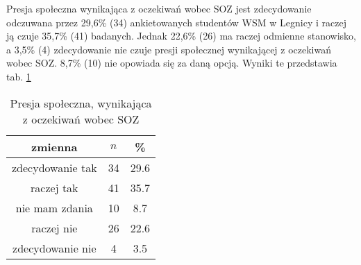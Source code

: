 
Presja społeczna wynikająca z oczekiwań wobec SOZ jest zdecydowanie odczuwana przez 29,6\%  (34) ankietowanych studentów WSM w Legnicy i raczej ją czuje  35,7\% (41) badanych. Jednak 22,6\% (26) ma  raczej odmienne stanowisko, a 3,5\% (4) zdecydowanie nie czuje presji społecznej wynikającej z oczekiwań wobec SOZ. 8,7\% (10) nie opowiada się za daną opcją. Wyniki te przedstawia tab. \ref{tab:Q15}

\begin{table}[H]
\caption{Presja społeczna, wynikająca z oczekiwań wobec SOZ}
\centering
\begin{tabular}{ | c | c | c |}
\hline
zmienna & $n$ & \% \\
\hline
zdecydowanie tak  &  34  & 29.6 \\
\hline
raczej tak  &  41  & 35.7 \\
\hline
nie mam zdania  &  10  & 8.7\\
\hline
raczej nie  &  26  & 22.6 \\
\hline
zdecydowanie nie  &  4  & 3.5\\
\hline
\end{tabular}
\label{tab:Q15}
\end{table}
